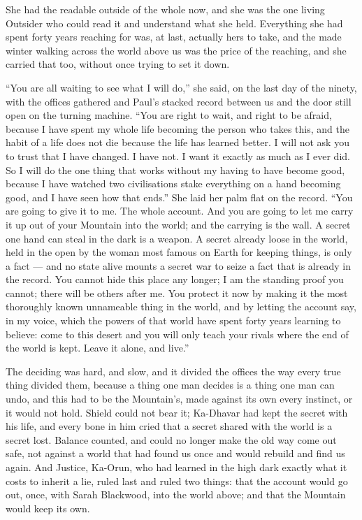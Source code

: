 She had the readable outside of the whole now, and she was the one living Outsider who could read it and understand what she held. Everything she had spent forty years reaching for was, at last, actually hers to take, and the made winter walking across the world above us was the price of the reaching, and she carried that too, without once trying to set it down.\par

``You are all waiting to see what I will do,'' she said, on the last day of the ninety, with the offices gathered and Paul's stacked record between us and the door still open on the turning machine. ``You are right to wait, and right to be afraid, because I have spent my whole life becoming the person who takes this, and the habit of a life does not die because the life has learned better. I will not ask you to trust that I have changed. I have not. I want it exactly as much as I ever did. So I will do the one thing that works without my having to have become good, because I have watched two civilisations stake everything on a hand becoming good, and I have seen how that ends.'' She laid her palm flat on the record. ``You are going to give it to me. The whole account. And you are going to let me carry it up out of your Mountain into the world; and the carrying is the wall. A secret one hand can steal in the dark is a weapon. A secret already loose in the world, held in the open by the woman most famous on Earth for keeping things, is only a fact --- and no state alive mounts a secret war to seize a fact that is already in the record. You cannot hide this place any longer; I am the standing proof you cannot; there will be others after me. You protect it now by making it the most thoroughly known unnameable thing in the world, and by letting the account say, in my voice, which the powers of that world have spent forty years learning to believe: come to this desert and you will only teach your rivals where the end of the world is kept. Leave it alone, and live.''\par

The deciding was hard, and slow, and it divided the offices the way every true thing divided them, because a thing one man decides is a thing one man can undo, and this had to be the Mountain's, made against its own every instinct, or it would not hold. Shield could not bear it; Ka-Dhavar had kept the secret with his life, and every bone in him cried that a secret shared with the world is a secret lost. Balance counted, and could no longer make the old way come out safe, not against a world that had found us once and would rebuild and find us again. And Justice, Ka-Orun, who had learned in the high dark exactly what it costs to inherit a lie, ruled last and ruled two things: that the account would go out, once, with Sarah Blackwood, into the world above; and that the Mountain would keep its own.\par

